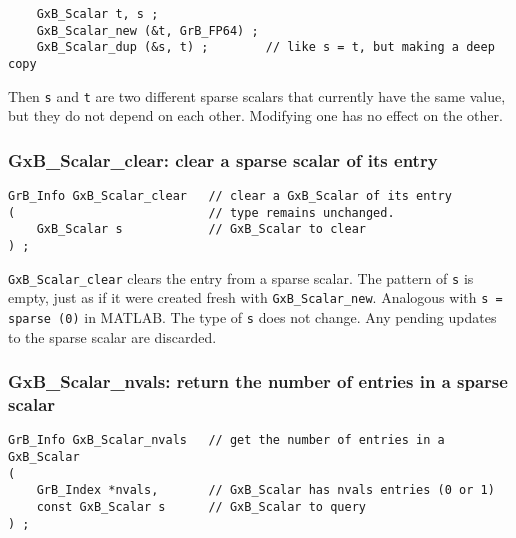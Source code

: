 \documentclass[12pt]{article}
\begin{document}
    {\footnotesize
    \begin{verbatim}
    GxB_Scalar t, s ;
    GxB_Scalar_new (&t, GrB_FP64) ;
    GxB_Scalar_dup (&s, t) ;        // like s = t, but making a deep copy \end{verbatim}}

Then \verb's' and \verb't' are two different sparse scalars that currently have
the same value, but they do not depend on each other.  Modifying one has no
effect on the other.

\subsubsection{{\sf GxB\_Scalar\_clear:} clear a sparse scalar of its entry}
\label{scalar_clear}

\begin{mdframed}[userdefinedwidth=6in]
{\footnotesize
\begin{verbatim}
GrB_Info GxB_Scalar_clear   // clear a GxB_Scalar of its entry
(                           // type remains unchanged.
    GxB_Scalar s            // GxB_Scalar to clear
) ;
\end{verbatim}
} \end{mdframed}

\verb'GxB_Scalar_clear' clears the entry from a sparse scalar.  The pattern of
\verb's' is empty, just as if it were created fresh with \verb'GxB_Scalar_new'.
Analogous with \verb's = sparse (0)' in MATLAB.  The type of \verb's' does not
change.  Any pending updates to the sparse scalar are discarded.

\newpage
\subsubsection{{\sf GxB\_Scalar\_nvals:} return the number of entries in a sparse scalar}
\label{scalar_nvals}

\begin{mdframed}[userdefinedwidth=6in]
{\footnotesize
\begin{verbatim}
GrB_Info GxB_Scalar_nvals   // get the number of entries in a GxB_Scalar
(
    GrB_Index *nvals,       // GxB_Scalar has nvals entries (0 or 1)
    const GxB_Scalar s      // GxB_Scalar to query
) ;
\end{verbatim}
} \end{mdframed}
\end{document}
